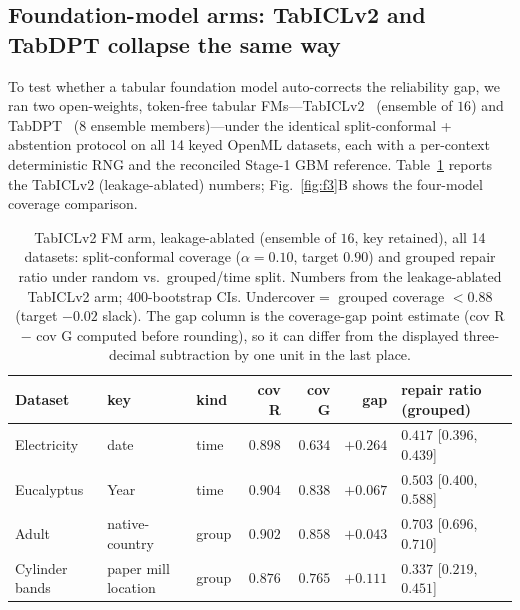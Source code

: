\documentclass[pdflatex,sn-mathphys-num]{sn-jnl}
\begin{document}
\subsection*{Foundation-model arms: TabICLv2 and TabDPT collapse the same way}
To test whether a tabular foundation model auto-corrects the reliability gap, we ran two
open-weights, token-free tabular FMs---TabICLv2~\citep{qu2026tabicl} (ensemble of $16$)
and TabDPT~\citep{ma2024tabdpt} ($8$ ensemble members)---under the identical split-conformal +
abstention protocol on all 14 keyed OpenML datasets, each with a per-context deterministic RNG and the reconciled
Stage-1 GBM reference. Table~\ref{tab:fm} reports the TabICLv2 (leakage-ablated) numbers; Fig.~\ref{fig:f3}B
shows the four-model coverage comparison.

\begin{table}[htbp]
\centering\small
\caption{TabICLv2 FM arm, leakage-ablated (ensemble of $16$, key retained), all 14 datasets:
split-conformal coverage ($\alpha=0.10$, target $0.90$) and grouped repair ratio under random vs.\
grouped/time split. Numbers from the leakage-ablated TabICLv2 arm; 400-bootstrap CIs.
Undercover$=$ grouped coverage $<0.88$ (target $-0.02$ slack). The gap column is the coverage-gap point
estimate (cov R $-$ cov G computed before rounding), so it can differ from the displayed three-decimal
subtraction by one unit in the last place.}\label{tab:fm}
\footnotesize
\setlength{\tabcolsep}{3.5pt}
\begin{tabular}{lllrrrl}
\toprule
Dataset & key & kind & cov R & cov G & gap & repair ratio (grouped) \\
\midrule
Electricity           & date                & time  & $0.898$ & $0.634$ & $+0.264$ & $0.417$ [$0.396$, $0.439$] \\
Eucalyptus            & Year                & time  & $0.904$ & $0.838$ & $+0.067$ & $0.503$ [$0.400$, $0.588$] \\
Adult                 & native-country      & group & $0.902$ & $0.858$ & $+0.043$ & $0.703$ [$0.696$, $0.710$] \\
Cylinder bands        & paper mill location & group & $0.876$ & $0.765$ & $+0.111$ & $0.337$ [$0.219$, $0.451$] \\

\end{tabular}
\end{table}
\end{document}
